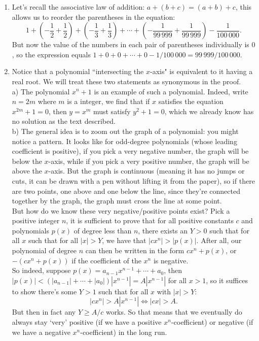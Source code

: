 \documentclass[11pt]{scrartcl}
\begin{document}
\begin{enumerate}[label=\textbf{A\arabic*}.]
    \item Let's recall the associative law of addition: $a+(b+c) = (a+b)+c$, this allows us to reorder the parentheses in the equation:
    \[ 1 + \left(- \frac{1}{2} + \frac{1}{2}\right) + \left(- \frac{1}{3} + \frac{1}{3}\right) + \cdots + \left(-\frac{1}{99\,999}+\frac{1}{99\,999}\right) - \frac{1}{100\,000}. \]
    But now the value of the numbers in each pair of parentheses individually is $0$, so the expression equals $1+0+0+\cdots+0-1/100\,000 = 99\,999/100\,000$.
    
    \item Notice that a polynomial ``intersecting the $x$-axis" is equivalent to it having a real root. We will treat these two statements as synonymous in the proof.\\
    a) The polynomial $x^n + 1$ is an example of such a polynomial. Indeed, write $n=2m$ where $m$ is a integer, we find that if $x$ satisfies the equation $x^{2m} + 1 = 0$, then $y=x^m$ must satisfy $y^2 + 1 = 0$, which we already know has no solution as the text described.\\
    b) The general idea is to zoom out the graph of a polynomial: you might notice a pattern. It looks like for odd-degree polynomials (whose leading coefficient is positive), if you pick a very negative number, the graph will be below the $x$-axis, while if you pick a very positive number, the graph will be above the $x$-axis. But the graph is continuous (meaning it has no jumps or cuts, it can be drawn with a pen without lifting it from the paper), so if there are two points, one above and one below the line, since they're connected together by the graph, the graph must cross the line at some point.\\
    But how do we know these very negative/positive points exist? Pick a positive integer $n$, it is sufficient to prove that for all positive constants $c$ and polynomials $p(x)$ of degree less than $n$, there exists an $Y>0$ such that for all $x$ such that for all $|x| > Y$, we have that $|cx^n| > |p(x)|$. After all, our polynomial of degree $n$ can then be written in the form $cx^n + p(x)$, or $-(cx^n + p(x))$ if the coefficient of the $x^n$ is negative.\\
    So indeed, suppose $p(x) = a_{n-1}x^{n-1} + \cdots + a_0$, then $|p(x)| < (|a_{n-1}| + \cdots + |a_0|)|x^{n-1}| = A|x^{n-1}|$ for all $x>1$, so it suffices to show there's some $Y>1$ such that for all $x$ with $|x|>Y$: $$|cx^n| > A|x^{n-1}| \Longleftrightarrow |cx| > A.$$
    But then in fact any $Y\ge A/c$ works. So that means that we eventually do always stay `very' positive (if we have a positive $x^n$-coefficient) or negative (if we have a negative $x^n$-coefficient) in the long run.
\end{enumerate}
\end{document}
